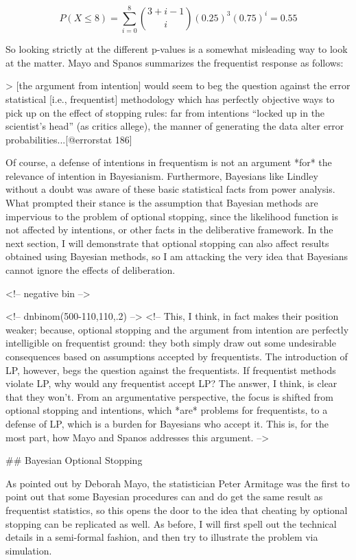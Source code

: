 \[P(X \leq 8) =  \sum_{i=0}^{8} {3+i-1 \choose i} (0.25)^3 (0.75)^{i} =0.55\]

So looking strictly at the different p-values is a somewhat misleading
way to look at the matter. Mayo and Spanos summarizes the frequentist
response as follows:

\textgreater{} {[}the argument from intention{]} would seem to beg the
question against the error statistical {[}i.e., frequentist{]}
methodology which has perfectly objective ways to pick up on the effect
of stopping rules: far from intentions ``locked up in the scientist's
head'' (as critics allege), the manner of generating the data alter
error probabilities...{[}@errorstat 186{]}

Of course, a defense of intentions in frequentism is not an argument
*for* the relevance of intention in Bayesianism. Furthermore, Bayesians
like Lindley without a doubt was aware of these basic statistical facts
from power analysis. What prompted their stance is the assumption that
Bayesian methods are impervious to the problem of optional stopping,
since the likelihood function is not affected by intentions, or other
facts in the deliberative framework. In the next section, I will
demonstrate that optional stopping can also affect results obtained
using Bayesian methods, so I am attacking the very idea that Bayesians
cannot ignore the effects of deliberation.

\textless{}!-- negative bin --\textgreater{}

\textless{}!-- dnbinom(500-110,110,.2) --\textgreater{} \textless{}!--
This, I think, in fact makes their position weaker; because, optional
stopping and the argument from intention are perfectly intelligible on
frequentist ground: they both simply draw out some undesirable
consequences based on assumptions accepted by frequentists. The
introduction of LP, however, begs the question against the frequentists.
If frequentist methods violate LP, why would any frequentist accept LP?
The answer, I think, is clear that they won't. From an argumentative
perspective, the focus is shifted from optional stopping and intentions,
which *are* problems for frequentists, to a defense of LP, which is a
burden for Bayesians who accept it. This is, for the most part, how Mayo
and Spanos addresses this argument. --\textgreater{}

\#\# Bayesian Optional Stopping

As pointed out by Deborah Mayo, the statistician Peter Armitage was the
first to point out that some Bayesian procedures can and do get the same
result as frequentist statistics, so this opens the door to the idea
that cheating by optional stopping can be replicated as well. As before,
I will first spell out the technical details in a semi-formal fashion,
and then try to illustrate the problem via simulation.

